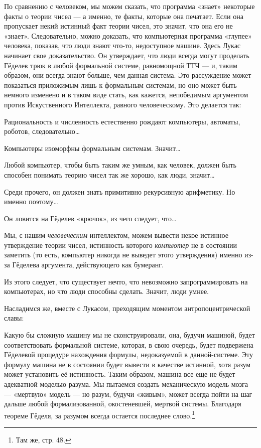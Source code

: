 \documentclass[../main.tex]{subfiles}
\begin{document}
По сравнению с человеком, мы можем сказать, что программа «знает» некоторые факты о теории чисел --- а именно, те факты, которые она печатает. Если она пропускает некий истинный факт теории чисел, это значит, что она его не «знает». Следовательно, можно доказать, что компьютерная программа «глупее» человека, показав, что люди знают что-то, недоступное машине. Здесь Лукас начинает свое доказательство. Он утверждает, что люди всегда могут проделать Гёделев трюк в любой формальной системе, равномощной ТТЧ --- и, таким образом, они всегда знают больше, чем данная система. Это рассуждение может показаться приложимым лишь к формальным системам, но оно может быть немного изменено и в таком виде стать, как кажется, непобедимым аргументом против Искуственного Интеллекта, равного человеческому. Это делается так:

Рациональность и численность естественно рождают компьютеры, автоматы, роботов, следовательно\ldots{}

Компьютеры изоморфны формальным системам. Значит\ldots{}

Любой компьютер, чтобы быть таким же умным, как человек, должен быть способен понимать теорию чисел так же хорошо, как люди, значит\ldots{}

Среди прочего, он должен знать примитивно рекурсивную арифметику. Но именно поэтому\ldots{}

Он ловится на Гёделев «крючок», из чего следует, что\ldots{}

Мы, с нашим \emph{человеческим} интеллектом, можем вывести некое истинное утверждение теории чисел, истинность которого \emph{компьютер} не в состоянии заметить (то есть, компьютер никогда не выведет этого утверждения) именно из-за Гёделева аргумента, действующего как бумеранг.

Из этого следует, что существует нечто, что невозможно запрограммировать на компьютерах, но что люди способны сделать. Значит, люди умнее.

Насладимся же, вместе с Лукасом, преходящим моментом антропоцентрической славы:

Какую бы сложную машину мы не сконструировали, она, будучи машиной, будет соответствовать формальной системе, которая, в свою очередь, будет подвержена Гёделевой процедуре нахождения формулы, недоказуемой в данной-системе. Эту формулу машина не в состоянии будет вывести в качестве истинной, хотя разум может установить её истинность. Таким образом, машина все еще не будет адекватной моделью разума. Мы пытаемся создать механическую модель мозга --- «мертвую» модель --- но разум, будучи «живым», может всегда пойти на шаг дальше любой формализованной, окостеневшей, мертвой системы. Благодаря теореме Гёделя, за разумом всегда остается последнее слово.\footnote{Там же, стр. 48.}
\end{document}
